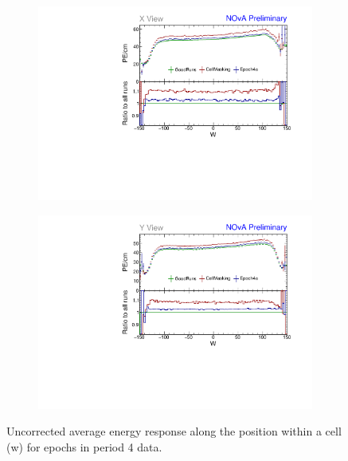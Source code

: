 \begin{figure}[!hbtp]
\centering
\begin{subfigure}[b]{0.495\textwidth}
\centering
\includegraphics[width=\textwidth]{Plots/TBCalibration/Attenprofs_P4Data_WPE_corr_xy_X_Combined.pdf}
\end{subfigure}
\begin{subfigure}[b]{0.495\textwidth}
\centering
\includegraphics[width=\textwidth]{Plots/TBCalibration/Attenprofs_P4Data_WPE_corr_xy_Y_Combined.pdf}
\end{subfigure}
\caption{Uncorrected average energy response along the position within a cell (w) for epochs in period 4 data.}
\label{fig:CalibhistWPE_period4}
\end{figure}

